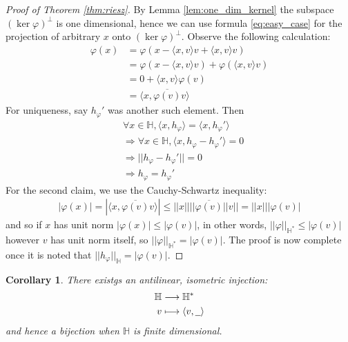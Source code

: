 \documentclass[12pt]{article}
\theoremstyle{plain}
\newtheorem{cor}[thm]{Corollary}
\theoremstyle{definition}
\newcommand{\bb}[1]{\mathbb{#1}}
\newcommand{\und}[1]{\underline{\hspace{#1 cm}}}
\newcommand{\lto}{\longrightarrow}
\begin{document}
\begin{proof}[Proof of Theorem \ref{thm:riesz}]
	By Lemma \ref{lem:one_dim_kernel} the subspace $(\operatorname{ker}\varphi)^\perp$ is one dimensional, hence we can use formula \eqref{eq:easy_case} for the projection of arbitrary $x$ onto $(\operatorname{ker}\varphi)^\perp$. Observe the following calculation:
	\begin{align*}
		\varphi(x) &= \varphi(x - \langle x,v\rangle v + \langle x,v\rangle v)\\
		&= \varphi(x - \langle x,v\rangle v) + \varphi(\langle x,v\rangle v)\\
		&= 0 + \langle x,v\rangle\varphi(v)\\
		&= \langle x, \overline{\varphi(v)}v\rangle
	\end{align*}
	For uniqueness, say $h_\varphi'$ was another such element. Then
	\begin{align*}
		&\forall x \in \bb{H}, \langle x, h_\varphi\rangle = \langle x, h_\varphi'\rangle\\
		&\Longrightarrow \forall x \in \bb{H}, \langle x, h_\varphi - h_\varphi'\rangle = 0\\
		&\Longrightarrow|| h_\varphi - h_\varphi'|| = 0\\
		&\Longrightarrow h_\varphi = h_\varphi'
	\end{align*}
	For the second claim, we use the Cauchy-Schwartz inequality:
	\begin{align*}
		|\varphi(x)| = |\langle x, \overline{\varphi(v)}v\rangle| \leq ||x||||\overline{\varphi(v)}||v|| = ||x|||\varphi(v)|
	\end{align*}
	and so if $x$ has unit norm $|\varphi(x)| \leq |\varphi(v)|$, in other words, $||\varphi||_{\bb{H}^\ast} \leq |\varphi(v)|$ however $v$ has unit norm itself, so $||\varphi||_{\bb{H}^\ast} = |\varphi(v)|$. The proof is now complete once it is noted that $||h_\varphi||_{\bb{H}} = |\varphi(v)|$.
\end{proof}
\begin{cor}\label{cor:antilinear_isometry}
	There existgs an antilinear, isometric injection:
	\begin{align}
		\bb{H} &\lto \bb{H}^\ast\\
		v &\longmapsto \langle v, \und{0.2}\rangle
	\end{align}
	 and hence a bijection when $\bb{H}$ is finite dimensional.
\end{cor}
\end{document}
